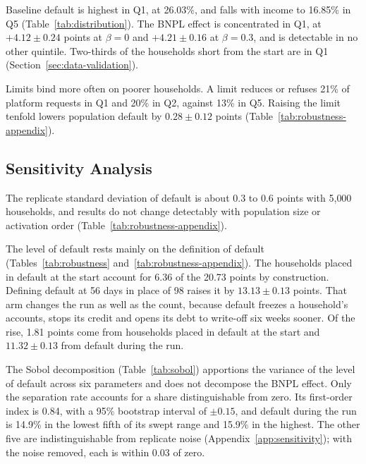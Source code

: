 Baseline default is highest in Q1, at 26.03\%, and falls with income to 16.85\% in Q5
(Table~\ref{tab:distribution}). The \ac{BNPL} effect is concentrated in Q1, at $+4.12 \pm 0.24$
points at $\beta=0$ and $+4.21 \pm 0.16$ at $\beta=0.3$, and is detectable in no other quintile.
Two-thirds of the households short from the start are in Q1
(Section~\ref{sec:data-validation}).

Limits bind more often on poorer households. A limit
reduces or refuses 21\% of platform requests in Q1 and 20\% in Q2, against 13\% in Q5. Raising
the limit tenfold lowers population default by $0.28 \pm 0.12$ points
(Table~\ref{tab:robustness-appendix}).



\subsection{Sensitivity Analysis}
\label{sec:results-robustness}

The replicate standard deviation of default is
about 0.3 to 0.6 points with 5{,}000 households, and results do not change detectably with population
size or activation order (Table~\ref{tab:robustness-appendix}).

The level of default rests mainly on the definition of default (Tables~\ref{tab:robustness}
and~\ref{tab:robustness-appendix}). The households placed in default
at the start account for 6.36 of the 20.73 points by construction. Defining default at 56 days in
place of 98 raises it by $13.13 \pm 0.13$ points. That arm changes the run as well as the count,
because default freezes a household's accounts, stops its credit and opens its debt to write-off
six weeks sooner. Of the rise, 1.81 points come from households placed
in default at the start and $11.32 \pm 0.13$ from default during the run.

The Sobol decomposition (Table~\ref{tab:sobol}) apportions the variance of the level of default
across six parameters and does not decompose the \ac{BNPL} effect. Only the separation rate accounts for a share
distinguishable from zero. Its
first-order index is 0.84, with a 95\% bootstrap interval of $\pm 0.15$, and default during the
run is 14.9\% in the lowest fifth of its swept range and 15.9\% in the highest. The other
five are indistinguishable from replicate noise (Appendix~\ref{app:sensitivity}); with the noise
removed, each is within 0.03 of zero.

